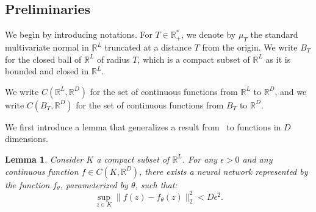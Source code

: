 \documentclass{article}
\newtheorem{lemma}{Lemma}
\begin{document}
\subsection{Preliminaries}

We begin by introducing notations. For $T \in \mathbb R^*_+$, we denote by $\mu_T$ the standard multivariate normal in $\mathbb{R}^L$ truncated at a distance $T$ from the origin. We write $B_T$ for the closed ball of $\mathbb{R}^L$ of radius $T$, which is a compact subset of $\mathbb{R}^L$ as it is bounded and closed in $\mathbb{R}^L$.

We write $C(\mathbb{R}^L,\mathbb{R}^D)$ for the set of continuous functions from $\mathbb{R}^L$ to $\mathbb{R}^D$, and we write $C(B_T,\mathbb{R}^D)$ for the set of continuous functions from $B_T$ to $\mathbb{R}^D$.

We first introduce a lemma that generalizes a result from~\cite{hornik1991approximation} to functions in $D$ dimensions.

\begin{lemma}\label{lemma:d_approx}
Consider $K$ a compact subset of $\mathbb{R}^L$. For any $\epsilon > 0$ and any continuous function $f \in C(K,\mathbb{R}^D)$, there exists a neural network represented by the function $f_\theta$, parameterized by $\theta$, such that:
\[
\sup_{z \in K} \| f(z) - f_\theta(z) \|_2^2 < D\epsilon^2.
\]
\end{lemma}
\end{document}

